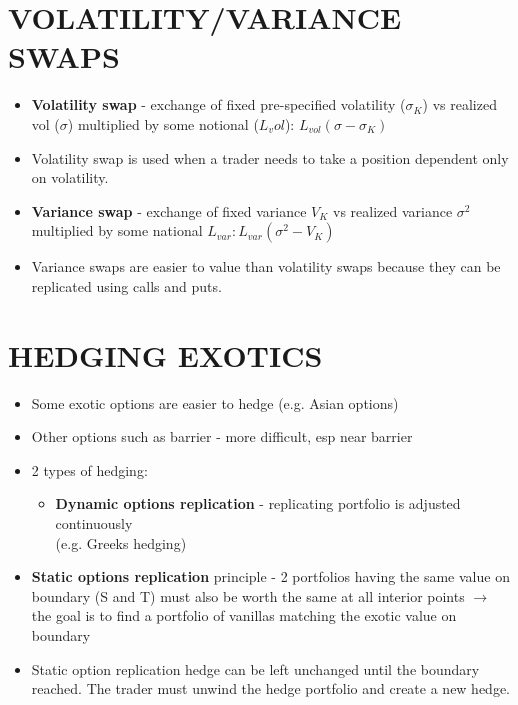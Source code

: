 \documentclass{article}
\begin{document}
\section{VOLATILITY/VARIANCE SWAPS}
\begin{itemize}
    \item {\bf Volatility swap} - exchange of fixed pre-specified volatility ($\sigma_K$) vs realized vol ($\sigma$) multiplied by some notional ($L_vol$): $L_{vol}(\sigma - \sigma_K)$
    \item Volatility swap is used when a trader needs to take a position dependent only on volatility.
    \bigskip
    \item {\bf Variance swap} - exchange of fixed variance $V_K$ vs realized variance $\sigma^2$ multiplied by some national $L_{var}: L_{var}(\sigma^2 - V_K)$
    \item Variance swaps are easier to value than volatility swaps because they can be replicated using calls and puts.
\end{itemize}
\section{HEDGING EXOTICS}
\begin{itemize}
    \item Some exotic options are easier to hedge (e.g. Asian options)
    \item Other options such as barrier - more difficult, esp near barrier
    \item 2 types of hedging:
    \begin{itemize}
        \item {\bf Dynamic options replication} - replicating portfolio is adjusted continuously\\ (e.g. Greeks hedging)
    \end{itemize}
    \item {\bf Static options replication} principle - 2 portfolios having the same value on boundary (S and T) must also be worth the same at all interior points $\rightarrow$ the goal is to find a portfolio of vanillas matching the exotic value on boundary
    \item Static option replication hedge can be left unchanged until the boundary reached. The trader must unwind the hedge portfolio and create a new hedge.
\end{itemize}
\end{document}

